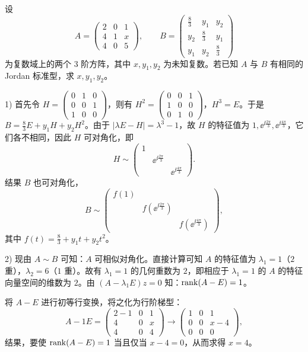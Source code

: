 设
\[
A=\begin{pmatrix}2&0&1\\4&1&x\\4&0&5\end{pmatrix},\qquad
B=\begin{pmatrix}\frac{8}{3}&y_1&y_2\\y_2&\frac{8}{3}&y_1\\y_1&y_2&\frac{8}{3}\end{pmatrix}
\]
为复数域上的两个 $3$ 阶方阵，其中 $x,y_1,y_2$ 为未知复数。若已知 $A$ 与 $B$ 有相同的 Jordan 标准型，求 $x,y_1,y_2$。
\begin{solution}
1) 首先令 $H=\begin{pmatrix}0&1&0\\0&0&1\\1&0&0\end{pmatrix}$，则有 $H^2=\begin{pmatrix}0&0&1\\1&0&0\\0&1&0\end{pmatrix}$，$H^3=E$。于是 $B=\frac{8}{3}E+y_1H+y_2H^2$。由于 $|\lambda E-H|=\lambda^3-1$，故 $H$ 的特征值为 $1,\ee^{\ii\frac{2\pi}{3}},\ee^{\ii\frac{4\pi}{3}}$，它们各不相同，因此 $H$ 可对角化，即
\[
H\sim\begin{pmatrix}1&&\\&\ee^{\ii\frac{2\pi}{3}}&\\&&\ee^{\ii\frac{4\pi}{3}}\end{pmatrix}.
\]
结果 $B$ 也可对角化，
\[
B\sim\begin{pmatrix}f(1)&&\\&f(\ee^{\ii\frac{2\pi}{3}})&\\&&f(\ee^{\ii\frac{4\pi}{3}})\end{pmatrix},
\]
其中 $f(t)=\frac{8}{3}+y_1t+y_2t^2$。

2) 现由 $A\sim B$ 可知：$A$ 可相似对角化。直接计算可知 $A$ 的特征值为 $\lambda_1=1$（$2$ 重），$\lambda_2=6$（$1$ 重）。故有 $\lambda_1=1$ 的几何重数为 $2$，即相应于 $\lambda_1=1$ 的 $A$ 的特征向量空间的维数为 $2$。由 $(A-\lambda_1E)z=0$ 知：$\operatorname{rank}(A-E)=1$。

将 $A-E$ 进行初等行变换，将之化为行阶梯型：
\[
A-1E=\begin{pmatrix}2-1&0&1\\4&0&x\\4&0&4\end{pmatrix}\to\begin{pmatrix}1&0&1\\0&0&x-4\\0&0&0\end{pmatrix},
\]
结果，要使 $\operatorname{rank}(A-E)=1$ 当且仅当 $x-4=0$，从而求得 $x=4$。


\end{solution}
